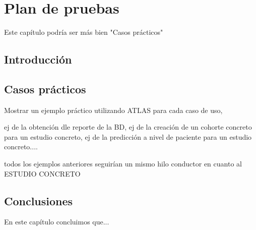 \chapter{Plan de pruebas}\label{cap:08pruebas}

Este capítulo podría ser más bien "Casos prácticos"

\section{Introducción}

\section{Casos prácticos}


Mostrar un ejemplo práctico utilizando ATLAS para cada caso de uso,

ej de la obtención dle reporte de la BD,
ej de la creación de un cohorte concreto para un estudio concreto,
ej de la predicción a nivel de paciente para un estudio concreto....

todos los ejemplos anteriores seguirían un mismo hilo conductor en cuanto al ESTUDIO CONCRETO

\section{Conclusiones}

En este capítulo concluimos que...